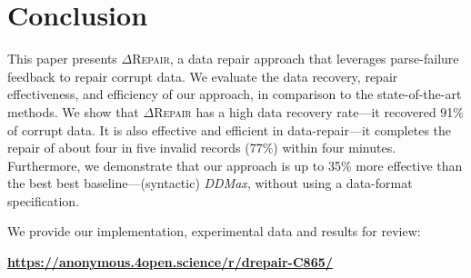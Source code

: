 \documentclass[acmsmall,screen,review,anonymous]{acmart}
\newcommand{\dtask}{data repair\xspace}
\newcommand{\approach}{\textsc{$\Delta$Repair}\xspace}
\newcommand{\ddmax}{\textit{DDMax}\xspace}
\newcommand{\drepair}{\approach}
\begin{document}
\section{Conclusion}
\label{sec:conclusion}
This paper presents \drepair, a \dtask approach that leverages parse-failure feedback to repair corrupt data.
We evaluate the data recovery, repair effectiveness, and efficiency of our approach, in comparison to the state-of-the-art methods. We show that \approach has a high data recovery rate---it recovered 91\% of corrupt data. 
It is also effective and efficient in data-repair---it completes the repair of about four in five invalid records (77\%) within four minutes. Furthermore, we demonstrate that our approach is up to 35\% more effective than the best 
best baseline---(syntactic) \ddmax, without using a data-format specification.

We provide our implementation, experimental data and results for review:


 \begin{center}
   \textbf{\url{https://anonymous.4open.science/r/drepair-C865/}} %
 \end{center}









\end{document}
